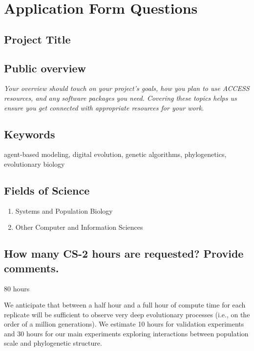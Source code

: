 \section{Application Form Questions}

\subsection{Project Title}

\subsection{Public overview}

\begin{displayquote} \itshape
Your overview should touch on your project's goals, how you plan to use ACCESS resources, and any software packages you need.
Covering these topics helps us ensure you get connected with appropriate resources for your work.
\end{displayquote}

\subsection{Keywords}

agent-based modeling, digital evolution, genetic algorithms, phylogenetics, evolutionary biology

\subsection{Fields of Science}

\begin{enumerate}
    \item Systems and Population Biology
    \item Other Computer and Information Sciences
\end{enumerate}

\subsection{How many CS-2 hours are requested? Provide comments.}

80 hours

We anticipate that between a half hour and a full hour of compute time for each replicate will be sufficient to observe very deep evolutionary processes (i.e., on the order of a million generations).
We estimate 10 hours for validation experiments and 30 hours for our main experiments exploring interactions between population scale and phylogenetic structure.

